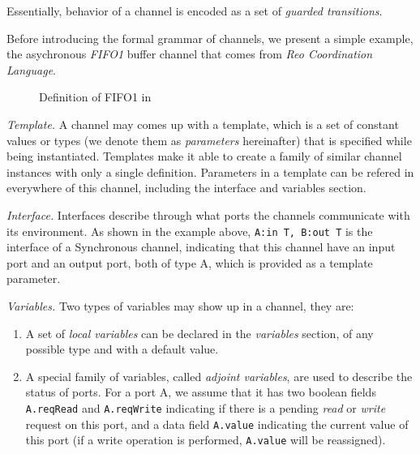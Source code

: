 Essentially, behavior of a channel is encoded as a set of \emph{guarded transitions}. 

Before introducing the formal grammar of channels, we present a simple example, the asychronous \emph{FIFO1} buffer channel that comes from \emph{Reo Coordination Language}\cite{ArbabMscs2004}.

\begin{example}
\label{exp:fifo1}
\begin{figure}
    \centering
    \begin{CenteredBox}
        
    \end{CenteredBox}
    \caption{Definition of FIFO1 in \lang{}}
\end{figure}
\end{example}

\vspace{0.2cm}
\noindent\emph{Template.} A channel may comes up with a template, which is a set of constant values or types (we denote them as \emph{parameters} hereinafter) that is specified while being instantiated. Templates make it able to create a family of similar channel instances with only a single definition. Parameters in a template can be refered in everywhere of this channel, including the interface and variables section.


\vspace{0.2cm}
\noindent \emph{Interface.} Interfaces describe through what ports the channels communicate with its environment. As shown in the example above, \texttt{A:in T, B:out T} is the interface of a Synchronous channel, indicating that this channel have an input port and an output port, both of type A, which is provided as a template parameter.

\vspace{0.2cm}
\noindent \emph{Variables.} Two types of variables may show up in a channel, they are:
\begin{enumerate}
    \item A set of \emph{local variables} can be declared in the \emph{variables} section, of any possible type and with a default value.
    \item A special family of variables, called \emph{adjoint variables}, are used to describe the status of ports. For a port A, we assume that it has two boolean fields \texttt{A.reqRead} and \texttt{A.reqWrite} indicating if there is a pending \emph{read} or \emph{write} request on this port, and a data field \texttt{A.value} indicating the current value of this port (if a write operation is performed, \texttt{A.value} will be reassigned).
\end{enumerate}

